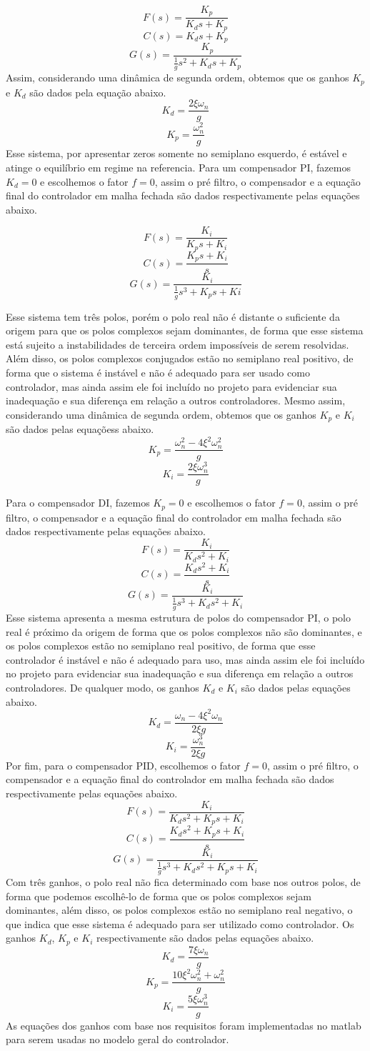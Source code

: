 \documentclass[a4paper, 12pt]{article}
\begin{document}
\[F(s)=\frac{K_p}{K_ds+K_p}\]
\[C(s)=K_ds+K_p\]
\[G(s)=\frac{K_p}{\frac{1}{g}s^2+K_ds+K_p}\]
Assim, considerando uma dinâmica de segunda ordem, obtemos que os ganhos $K_p$ e $K_d$ são dados pela equação abaixo.
\[K_d=\frac{2\xi\omega_n}{g}\]
\[K_p=\frac{\omega_n^2}{g}\]
Esse sistema, por apresentar zeros somente no semiplano esquerdo, é estável e atinge o equilíbrio em regime na referencia. Para um compensador PI, fazemos $K_d=0$ e escolhemos o fator $f=0$, assim o pré filtro, o compensador e a equação final do controlador em malha fechada são dados respectivamente pelas equações abaixo.

\[F(s)=\frac{K_i}{K_ps+K_i}\]
\[C(s)=\frac{K_ps+K_i}{s}\]
\[G(s)=\frac{K_i}{\frac{1}{g}s^3+K_ps+Ki}\]

Esse sistema tem três polos, porém o polo real não é distante o suficiente da origem para que os polos complexos sejam dominantes, de forma que esse sistema está sujeito a instabilidades de terceira ordem impossíveis de serem resolvidas. Além disso, os polos complexos conjugados estão no semiplano real positivo, de forma que o sistema é instável e não é adequado para ser usado como controlador, mas ainda assim ele foi incluído no projeto para evidenciar sua inadequação e sua diferença em relação a outros controladores. Mesmo assim, considerando uma dinâmica de segunda ordem, obtemos que os ganhos $K_p$ e $K_i$ são dados pelas equaçõess abaixo.
\[K_p=\frac{\omega_n^2-4\xi^2\omega_n^2}{g}\]
\[K_i=\frac{2\xi\omega_n^3}{g}\]

Para o compensador DI, fazemos $K_p=0$ e escolhemos o fator $f=0$, assim o pré filtro, o compensador e a equação final do controlador em malha fechada são dados respectivamente pelas equações abaixo.
\[F(s)=\frac{K_i}{K_ds^2+K_i}\]
\[C(s)=\frac{K_ds^2+K_i}{s}\]
\[G(s)=\frac{K_i}{\frac{1}{g}s^3+K_ds^2+K_i}\]
Esse sistema apresenta a mesma estrutura de polos do compensador PI, o polo real é próximo da origem de forma que os polos complexos não são dominantes, e os polos complexos estão no semiplano real positivo, de forma que esse controlador é instável e não é adequado para uso, mas ainda assim ele foi incluído no projeto para evidenciar sua inadequação e sua diferença em relação a outros controladores. De qualquer modo, os ganhos $K_d$ e $K_i$ são dados pelas equações abaixo.
\[K_d=\frac{\omega_n-4\xi^2\omega_n}{2\xi g}\]
\[K_i=\frac{\omega_n^3}{2\xi g}\]
Por fim, para o compensador PID, escolhemos o fator $f=0$, assim o pré filtro, o compensador e a equação final do controlador em malha fechada são dados respectivamente pelas equações abaixo.
\[F(s)=\frac{K_i}{K_ds^2+K_ps+K_i}\]
\[C(s)=\frac{K_ds^2+K_ps+K_i}{s}\]
\[G(s)=\frac{K_i}{\frac{1}{g}s^3+K_ds^2+K_ps+K_i}\]
Com três ganhos, o polo real não fica determinado com base nos outros polos, de forma que podemos escolhê-lo de forma que os polos complexos sejam dominantes, além disso, os polos complexos estão no semiplano real negativo, o que indica que esse sistema é adequado para ser utilizado como controlador. Os ganhos $K_d$, $K_p$ e $K_i$ respectivamente são dados pelas equações abaixo.
\[K_d=\frac{7\xi\omega_n}{g}\]
\[K_p=\frac{10\xi^2\omega_n^2+\omega_n^2}{g}\]
\[K_i=\frac{5\xi\omega_n^3}{g}\]
As equações dos ganhos com base nos requisitos foram implementadas no matlab para serem usadas no modelo geral do controlador.
\end{document}
